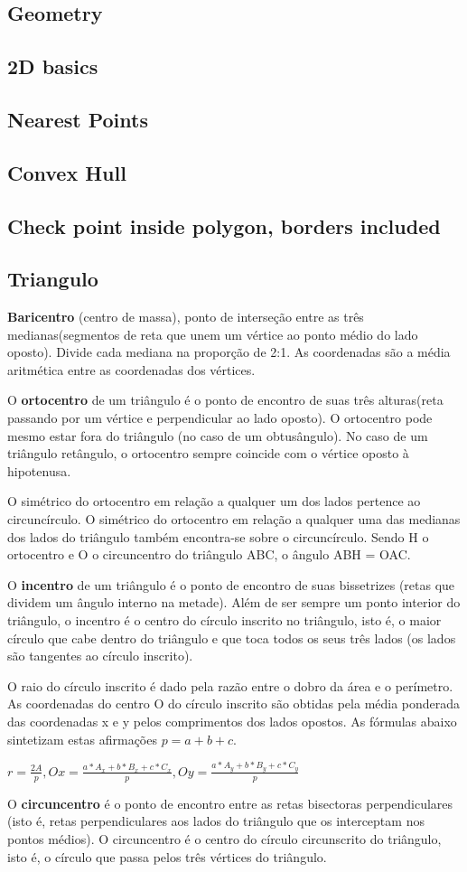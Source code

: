 \documentclass[a4paper,10pt,oneside]{article}
\newcommand\includes[2]{
   \subsection{#1}
   
}
\begin{document}
\begin{multicols}{2}
\section{Geometry}
\includes{2D basics}{code/geometry/2D.cpp}
\includes{Nearest Points}{code/geometry/near.cpp}
\includes{Convex Hull}{code/geometry/convexhull.cpp}
\includes{Check point inside polygon, borders included}{code/geometry/in_poly.cpp}

\subsection{Triangulo}
\textbf{Baricentro} (centro de massa), ponto de interseção entre as três medianas(segmentos de reta que unem um vértice ao ponto médio do lado oposto). Divide cada mediana na proporção de 2:1. As coordenadas são a média aritmética entre as coordenadas dos vértices.

O \textbf{ortocentro} de um triângulo é o ponto de encontro de suas três alturas(reta passando por um vértice e perpendicular ao lado oposto). O ortocentro pode mesmo estar fora do triângulo (no caso de um obtusângulo). No caso de um triângulo retângulo, o ortocentro sempre coincide com o vértice oposto à hipotenusa.

O simétrico do ortocentro em relação a qualquer um dos lados pertence ao circuncírculo.
O simétrico do ortocentro em relação a qualquer uma das medianas dos lados do triângulo também encontra-se sobre o circuncírculo.
Sendo H o ortocentro e O o circuncentro do triângulo ABC, o ângulo ABH = OAC.

O \textbf{incentro} de um triângulo é o ponto de encontro de suas bissetrizes (retas que dividem um ângulo interno na metade). Além de ser sempre um ponto interior do triângulo, o incentro é o centro do círculo inscrito no triângulo, isto é, o maior círculo que cabe dentro do triângulo e que toca todos os seus três lados (os lados são tangentes ao círculo inscrito).

O raio do círculo inscrito é dado pela razão entre o dobro da área e o perímetro. As coordenadas do centro O do círculo inscrito são obtidas pela média ponderada das coordenadas x e y pelos comprimentos dos lados opostos. As fórmulas abaixo sintetizam estas afirmações $p = a+b+c$.

$r = \frac{2A}{p}, Ox = \frac{a*A_x + b*B_x + c*C_x}{p}, Oy = \frac{a*A_y + b*B_y + c*C_y}{p}$

O \textbf{circuncentro} é o ponto de encontro entre as retas bisectoras perpendiculares (isto é, retas perpendiculares aos lados do triângulo que os interceptam nos pontos médios). O circuncentro é o centro do círculo circunscrito do triângulo, isto é, o círculo que passa pelos três vértices do triângulo.


\end{multicols}
\end{document}
